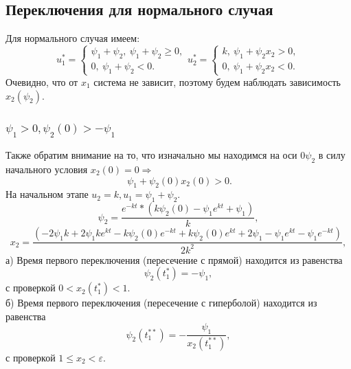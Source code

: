 \documentclass[12pt, fleqn]{article}
\begin{document}
\subsection{Переключения для нормального случая}
Для нормального случая имеем:
$$
u_1^* = \begin{cases}
\psi_1 + \psi_2, \ \psi_1 + \psi_2 \geqslant 0, \\
0, \ \psi_1 + \psi_2 < 0.
\end{cases}
u_2^* =  \begin{cases}
k, \ \psi_1 + \psi_2x_2 > 0,\\
0, \ \psi_1 + \psi_2x_2 < 0.
\end{cases}
$$
Очевидно, что от $x_1$ система не зависит, поэтому будем наблюдать зависимость $x_2(\psi_2).$ 
\subsubsection{$\psi_1 > 0, \psi_2(0) > -\psi_1$}
Также обратим внимание на то, что изначально мы находимся на оси $0\psi_2$ в силу начального условия $x_2(0) = 0 \Rightarrow$ $$ \ \psi_1 + \psi_2(0)x_2(0) > 0.$$
На начальном этапе $u_2 = k, u_1 = \psi_1 + \psi_2$.\\
\begin{equation}
\psi_2 = \frac{e^{-kt}*(k\psi_2(0) - \psi_1e^{kt} + \psi_1)}{k},
\end{equation}
\begin{equation}
x_2 = \frac{(-2\psi_1k + 2\psi_1ke^{kt} - k\psi_2(0)e^{-kt} + k\psi_2(0)e^{kt} + 2\psi_1 -\psi_1e^{kt} - \psi_1e^{-kt})}{2k^2},
\end{equation}
а) Время первого переключения (пересечение с прямой) находится из равенства $$\psi_2(t_1^*) = - \psi_1, $$ с проверкой $ 0 < x_2(t_1^*) < 1.$\\
б) Время первого переключения (пересечение с гиперболой) находится из равенства $$\psi_2(t_1^{**}) = -\frac{\psi_1}{x_2(t_1^{**})},$$ с проверкой $1 \leqslant x_2 <\varepsilon.$\\
\end{document}

